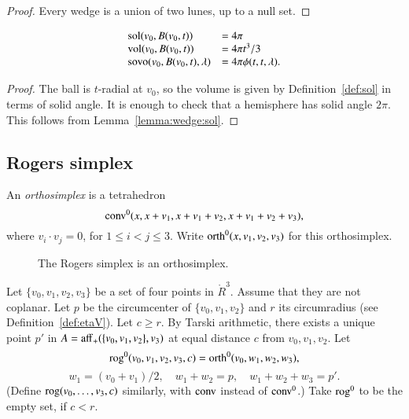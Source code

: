 \begin{proof} Every wedge is a union of two lunes, up to a null set.
\end{proof}

\begin{lemma}  
   $$
   \begin{array}{lll}
    {\operatorname{sol}}(v_0,B(v_0,t)) &= 4\pi\\
    {\operatorname{vol}}(v_0,B(v_0,t)) &= 4\pi t^3/3\\
    {\operatorname{sovo}}(v_0,B(v_0,t),\lambda) &= 4 \pi \phi(t,t,\lambda).
   \end{array}
   $$
\end{lemma}

\begin{proof}
The ball is $t$-radial at $v_0$, so the volume is given by
Definition~\ref{def:sol} in terms of solid angle.  It is enough
to check that a hemisphere has solid angle $2\pi$.  This follows
from Lemma~\ref{lemma:wedge:sol}.
\end{proof}  




\subsection{Rogers simplex}

\begin{definition} 
An {\it orthosimplex} is a tetrahedron
    $${\operatorname{conv}}^0(x,x+v_1,x+v_1+v_2,x+v_1+v_2+v_3),$$
where $v_i\cdot v_j=0$, for $1\le i<j\le 3$.   Write
${\operatorname{orth}}^0(x,v_1,v_2,v_3)$ for this orthosimplex.
\end{definition}

\begin{figure}[htb]
  \centering
  \caption{The Rogers simplex is an orthosimplex.}
\end{figure}


\begin{definition} 
Let $\{v_0,v_1,v_2,v_3\}$ be a set of four points in $\ring{R}^3$.
Assume that they are not coplanar.  Let $p$ be the circumcenter
of $\{v_0,v_1,v_2\}$ and $r$ its circumradius (see Definition~\ref{def:etaV}).  Let $c\ge r$.
By Tarski arithmetic, %
there exists a unique point $p'$ in $A={\operatorname{aff}}_+(\{v_0,v_1,v_2\},v_3)$ at equal distance $c$
from $v_0,v_1,v_2$.
Let 
$$
    {\operatorname{rog}}^0(v_0,v_1,v_2,v_3,c) = 
    {\operatorname{orth}}^0(v_0,w_1,w_2,w_3),
$$
$$
     w_1=(v_0+v_1)/2,\quad w_1+w_2=p,\quad w_1+w_2+w_3=p'.
$$
(Define ${\operatorname{rog}}(v_0,\ldots,v_3,c)$ similarly, with
${\operatorname{conv}}$ instead of ${\operatorname{conv}}^0$.)
Take ${\operatorname{rog}}^0$ to be the empty set, if $c< r$.
\end{definition}

